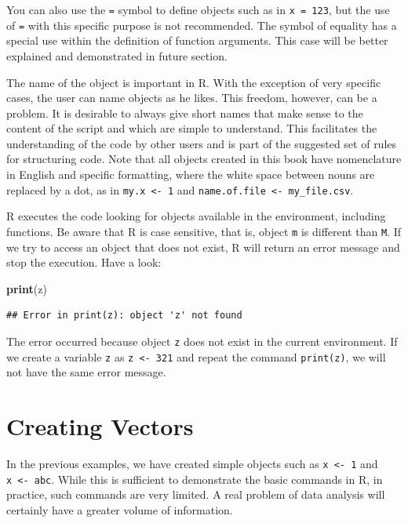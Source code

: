 \documentclass[11pt,]{book}
\newenvironment{Shaded}{\begin{snugshade}}{\end{snugshade}}
\newcommand{\KeywordTok}[1]{\textcolor[rgb]{0.27,0.27,0.27}{\textbf{#1}}}
\newcommand{\NormalTok}[1]{#1}
\begin{document}
You can also use the \texttt{=} symbol to define objects such as in
\texttt{x\ =\ 123}, but the use of \texttt{=} with this specific purpose
is not recommended. The symbol of equality has a special use within the
definition of function arguments. This case will be better explained and
demonstrated in future section.

The name of the object is important in R. With the exception of very
specific cases, the user can name objects as he likes. This freedom,
however, can be a problem. It is desirable to always give short names
that make sense to the content of the script and which are simple to
understand. This facilitates the understanding of the code by other
users and is part of the suggested set of rules for structuring code.
Note that all objects created in this book have nomenclature in English
and specific formatting, where the white space between nouns are
replaced by a dot, as in \texttt{my.x\ \textless{}-\ 1} and
\texttt{name.of.file\ \textless{}-\ \textquotesingle{}my\_file.csv\textquotesingle{}}.

R executes the code looking for objects available in the environment,
including functions. Be aware that R is case sensitive, that is, object
\texttt{m} is different than \texttt{M}. If we try to access an object
that does not exist, R will return an error message and stop the
execution. Have a look:

\begin{Shaded}
\begin{Highlighting}[]
\KeywordTok{print}\NormalTok{(z)}
\end{Highlighting}
\end{Shaded}

\begin{verbatim}
## Error in print(z): object 'z' not found
\end{verbatim}

The error occurred because object \texttt{z} does not exist in the
current environment. If we create a variable \texttt{z} as
\texttt{z\ \textless{}-\ 321} and repeat the command \texttt{print(z)},
we will not have the same error message.

\section{Creating Vectors}\label{creating-vectors}

In the previous examples, we have created simple objects such as
\texttt{x\ \textless{}-\ 1} and
\texttt{x\ \textless{}-\ \textquotesingle{}abc\textquotesingle{}}. While
this is sufficient to demonstrate the basic commands in R, in practice,
such commands are very limited. A real problem of data analysis will
certainly have a greater volume of information.
\end{document}
